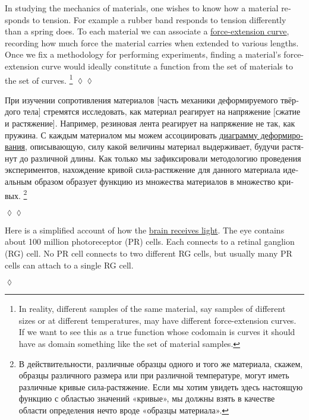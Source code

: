 \documentclass{book}
\theoremstyle{theoremENG}
\theoremstyle{lemmaENG}
\theoremstyle{propositionENG}
\theoremstyle{corollaryENG}
\theoremstyle{factENG}
\theoremstyle{remarkENG}
\theoremstyle{exampleENG}
\theoremstyle{warningENG}
\theoremstyle{questionENG}
\theoremstyle{guessENG}
\theoremstyle{answerENG}
\theoremstyle{constructionENG}
\theoremstyle{rulesENG}
\theoremstyle{excENG}
\newtheorem{excENG}[subsubsection]{\begin{english}Exercise\end{english}}
\theoremstyle{appENG}
\newtheorem{appENG}[subsubsection]{\begin{english}Application\end{english}}
\theoremstyle{definitionENG}
\theoremstyle{notationENG}
\theoremstyle{conjectureENG}
\theoremstyle{postulateENG}
\newenvironment{exerciseENG}{\begin{excENG}}{\hspace*{\fill}$\lozenge$\end{excENG}}
\newenvironment{applicationENG}{\begin{appENG}}{\hspace*{\fill}$\lozenge\lozenge$\end{appENG}}
\theoremstyle{theoremRUS}
\theoremstyle{lemmaRUS}
\theoremstyle{propositionRUS}
\theoremstyle{corollaryRUS}
\theoremstyle{factRUS}
\theoremstyle{remarkRUS}
\theoremstyle{exampleRUS}
\theoremstyle{warningRUS}
\theoremstyle{questionRUS}
\theoremstyle{guessRUS}
\theoremstyle{answerRUS}
\theoremstyle{constructionRUS}
\theoremstyle{rulesRUS}
\theoremstyle{excRUS}
\theoremstyle{appRUS}
\newtheorem{appRUS}[subsubsection]{\begin{russian}Прикладной пример (применение)\end{russian}}
\theoremstyle{definitionRUS}
\theoremstyle{notationRUS}
\theoremstyle{conjectureRUS}
\theoremstyle{postulateRUS}
\newenvironment{applicationRUS}{\begin{appRUS}}{\hspace*{\fill}$\lozenge\lozenge$\end{appRUS}}
\begin{document}
\begin{english}
\begin{applicationENG}\label{app:force-extension}
In studying the mechanics of materials, one wishes to know how a material responds to tension. For example a rubber band responds to tension differently than a spring does. To each material we can associate a \href{http://en.wikipedia.org/wiki/Stress–strain_curve}{\text force-extension curve}, recording how much force the material carries when extended to various lengths. Once we fix a methodology for performing experiments, finding a material's force-extension curve would ideally constitute a function from the set of materials to the set of curves.
\footnote{In reality, different samples of the same material, say samples of different sizes or at different temperatures, may have different force-extension curves. If we want to see this as a true function whose codomain is curves it should have as domain something like the set of material samples.}
\end{applicationENG}

\begin{applicationRUS}\label{app:force-extension}
\begin{russian}
При изучении сопротивления материалов [часть механики деформируемого твёрдого тела] стремятся исследовать, как материал реагирует на напряжение [сжатие и растяжение]. Например, резиновая лента реагирует на напряжение не так, как пружина. С каждым материалом мы можем ассоциировать \href{https://ru.wikipedia.org/wiki/%D0%94%D0%B8%D0%B0%D0%B3%D1%80%D0%B0%D0%BC%D0%BC%D0%B0_%D0%B4%D0%B5%D1%84%D0%BE%D1%80%D0%BC%D0%B8%D1%80%D0%BE%D0%B2%D0%B0%D0%BD%D0%B8%D1%8F}{\text диаграмму деформирования}, описывающую, силу какой величины материал выдерживает, будучи растянут до различной длины. Как только мы зафиксировали методологию проведения экспериментов, нахождение кривой сила-растяжение для данного материала идеальным образом образует функцию из множества материалов в множество кривых.
\footnote{В действительности, различные образцы одного и того же материала, скажем, образцы различного размера или при различной температуре, могут иметь различные кривые сила-растяжение. Если мы хотим увидеть здесь настоящую функцию с областью значений «кривые», мы должны взять в качестве области определения нечто вроде «образцы материала».} 
\end{russian}
\end{applicationRUS}

\begin{exerciseENG}
Here is a simplified account of how the \href{http://en.wikipedia.org/wiki/Retina}{\text brain receives light}. The eye contains about 100 million photoreceptor (PR) cells. Each connects to a retinal ganglion (RG) cell. No PR cell connects to two different RG cells, but usually many PR cells can attach to a single RG cell. 


\end{exerciseENG}
\end{english}
\end{document}
